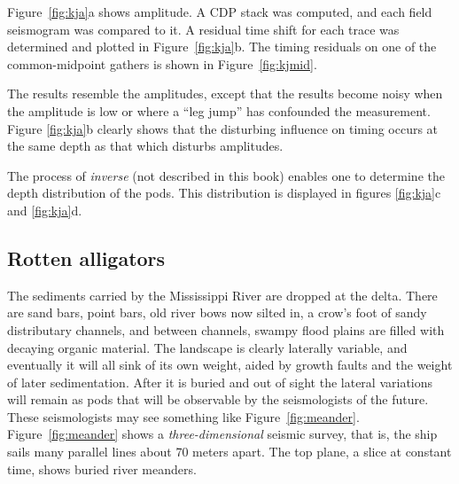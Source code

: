 Figure~\ref{fig:kja}a shows amplitude.
A CDP stack was computed, and each field
seismogram was compared to it.
A residual time shift for each trace was determined
and plotted in Figure~\ref{fig:kja}b.
The timing residuals on one of the common-midpoint
gathers is shown in Figure~\ref{fig:kjmid}.
\par
The results resemble the amplitudes, except that the
results become noisy when the amplitude is low or
where a ``leg jump'' has confounded the measurement.
Figure \ref{fig:kja}b clearly shows that the disturbing influence on timing
occurs at the same depth as that which disturbs amplitudes.

\par
The process of 
{\em  inverse }
(not described in this book)
enables one to determine the depth distribution of the pods.
This distribution is displayed
in figures \ref{fig:kja}c and \ref{fig:kja}d.
\subsection{Rotten alligators}
\par
The sediments carried by the Mississippi River are dropped at the delta.
There are sand bars, point bars, old river bows now silted in,
a crow's foot of sandy distributary channels,
and between channels, swampy flood plains 
are filled with decaying organic material.
The landscape is clearly laterally variable,
and eventually it will all sink of its own weight,
aided by growth faults and the weight of later sedimentation.
After it is buried and out of sight the lateral variations will remain
as pods that will be observable by the seismologists of the future.
These seismologists may see something like Figure~\ref{fig:meander}.
Figure~\ref{fig:meander} shows a %
{\em  three-dimensional %
} seismic survey,
that is, the ship sails many parallel lines about 70 meters apart.
The top plane, a slice at constant time, shows buried river meanders.

